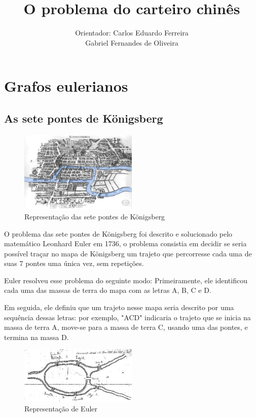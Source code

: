 \documentclass[12pt, a4paper]{article}
\title{O problema do carteiro chinês}
\author{Orientador: Carlos Eduardo Ferreira\\Gabriel Fernandes de Oliveira}
\date{}
\begin{document}
\maketitle


\newpage
\tableofcontents
\newpage


\section{Grafos eulerianos}

\subsection{As sete pontes de Königsberg}

\begin{figure} 
    \centering
    \includegraphics[width=0.5\textwidth]{konigsberg.png}
    \caption{Representação das sete pontes de Königsberg}
\end{figure}

O problema das sete pontes de Königsberg foi descrito e solucionado pelo matemático Leonhard Euler em 1736, o problema consistia em decidir se seria possível traçar no mapa de Königsberg um trajeto que percorresse cada uma de suas 7 pontes uma única vez, sem repetições.

Euler resolveu esse problema do seguinte modo: 
Primeiramente, ele identificou cada uma das massas de terra do mapa com as letras A, B, C e D.

Em seguida, ele definiu que um trajeto nesse mapa seria descrito por uma sequência dessas letras: por exemplo, "ACD" indicaria o trajeto que se inicia na massa de terra A, move-se para a massa de terra C, usando uma das pontes, e termina na massa D.

\begin{figure} 
    \centering
    \includegraphics[width=0.5\textwidth]{konigsberg-euler.png}
    \caption{Representação de Euler}
	\label{konigsberg-euler}
\end{figure}
\end{document}
